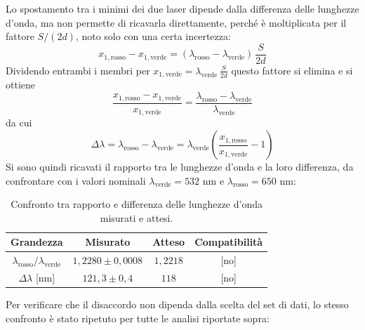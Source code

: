 \documentclass[10pt,twocolumn]{article}
\begin{document}
\noindent
Lo spostamento tra i minimi dei due laser dipende dalla differenza delle lunghezze d'onda, ma non permette di ricavarla
direttamente, perché è moltiplicata per il fattore $S/(2d)$, noto solo con una certa incertezza:
\begin{equation}
  x_{1,\mathrm{rosso}} - x_{1,\mathrm{verde}} = (\lambda_{\mathrm{rosso}} - \lambda_{\mathrm{verde}})\,\frac{S}{2d}
\end{equation}
Dividendo entrambi i membri per $x_{1,\mathrm{verde}} = \lambda_{\mathrm{verde}}\,\frac{S}{2d}$ questo fattore si elimina e si ottiene
\begin{equation}
  \frac{x_{1,\mathrm{rosso}} - x_{1,\mathrm{verde}}}{x_{1,\mathrm{verde}}}
  = \frac{\lambda_{\mathrm{rosso}} - \lambda_{\mathrm{verde}}}{\lambda_{\mathrm{verde}}}
\end{equation}
da cui
\begin{equation}
  \Delta\lambda = \lambda_{\mathrm{rosso}} - \lambda_{\mathrm{verde}}
  = \lambda_{\mathrm{verde}}\left(\frac{x_{1,\mathrm{rosso}}}{x_{1,\mathrm{verde}}} - 1\right)
\end{equation}
Si sono quindi ricavati il rapporto tra le lunghezze d'onda e la loro differenza, da confrontare con i valori nominali
$\lambda_{\mathrm{verde}} = 532$ nm e $\lambda_{\mathrm{rosso}} = 650$ nm:

\begin{table}[H]
  \centering
  \small
  \begin{tabular}{cccc}
    \toprule
    Grandezza & Misurato & Atteso & Compatibilità \\
    \midrule
    $\lambda_{\mathrm{rosso}}/\lambda_{\mathrm{verde}}$ & $1{,}2280 \pm 0{,}0008$ & $1{,}2218$ & [no] \\
    $\Delta\lambda$ [nm] & $121{,}3 \pm 0{,}4$ & $118$ & [no] \\
    \bottomrule
  \end{tabular}
  \caption{Confronto tra rapporto e differenza delle lunghezze d'onda misurati e attesi.}
  \label{tab:confronto_lambda}
\end{table}

\noindent
Per verificare che il disaccordo non dipenda dalla scelta del set di dati, lo stesso confronto è stato ripetuto
per tutte le analisi riportate sopra:
\end{document}
